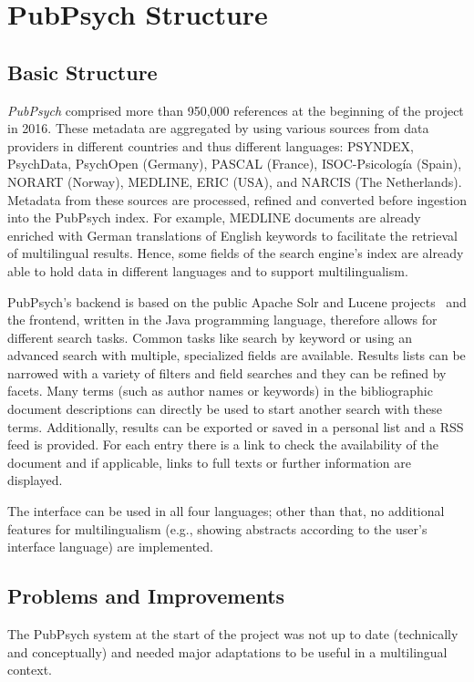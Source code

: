 \documentclass[a4paper,11pt]{article}
\begin{document}
\section{PubPsych Structure}
\label{s:pubpsych_structure}
\subsection{Basic Structure}
\label{ss:pubStruc_basic}
\textit{PubPsych} comprised more than 950,000 references at the beginning of the project in 2016. These metadata are aggregated by using various sources from data providers in different countries and thus different languages: PSYNDEX, PsychData, PsychOpen (Germany), PASCAL (France), ISOC-Psicología (Spain), NORART (Norway), MEDLINE, ERIC (USA), and NARCIS (The Netherlands). Metadata from these sources are processed, refined and converted before ingestion into the PubPsych index. For example, MEDLINE documents are already enriched with German translations of English keywords to facilitate the retrieval of multilingual results. Hence, some fields of the search engine's index are already able to hold data in different languages and to support multilingualism.

PubPsych's backend is based on the public Apache Solr and Lucene projects~\cite{solr} and the frontend, written in the Java programming language, therefore allows for different search tasks. Common tasks like search by keyword or using an advanced search with multiple, specialized fields are available. Results lists can be narrowed with a variety of filters and field searches and they can be refined by facets. Many terms (such as author names or keywords) in the bibliographic document descriptions can directly be used to start another search with these terms. Additionally, results can be exported or saved in a personal list and a RSS feed is provided. For each entry there is a link to check the availability of the document and if applicable, links to full texts or further information are displayed.

The interface can be used in all four languages; other than that, no additional features for multilingualism (e.g., showing abstracts according to the user's interface language) are implemented.

\subsection{Problems and Improvements}
\label{ss:pubStruc_probs}

The PubPsych system at the start of the project was not up to date (technically and conceptually) and needed major adaptations to be useful in a multilingual context.
\end{document}

